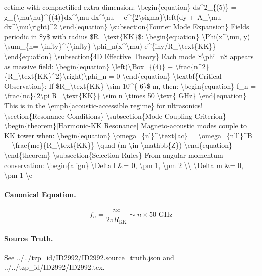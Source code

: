 cetime with compactified extra dimension: \textbackslash{}begin\{equation\} ds\textasciicircum{}2\_\{(5)\} = g\_\{\textbackslash{}mu\textbackslash{}nu\}\textasciicircum{}\{(4)\}dx\textasciicircum{}\textbackslash{}mu dx\textasciicircum{}\textbackslash{}nu + e\textasciicircum{}\{2\textbackslash{}sigma\}\textbackslash{}left(dy + A\_\textbackslash{}mu dx\textasciicircum{}\textbackslash{}mu\textbackslash{}right)\textasciicircum{}2 \textbackslash{}end\{equation\} \textbackslash{}subsection\{Fourier Mode Expansion\} Fields periodic in \$y\$ with radius \$R\_\textbackslash{}text\{KK\}\$: \textbackslash{}begin\{equation\} \textbackslash{}Phi(x\textasciicircum{}\textbackslash{}mu, y) = \textbackslash{}sum\_\{n=-\textbackslash{}infty\}\textasciicircum{}\{\textbackslash{}infty\} \textbackslash{}phi\_n(x\textasciicircum{}\textbackslash{}mu) e\textasciicircum{}\{iny/R\_\textbackslash{}text\{KK\}\} \textbackslash{}end\{equation\} \textbackslash{}subsection\{4D Effective Theory\} Each mode \$\textbackslash{}phi\_n\$ appears as massive field: \textbackslash{}begin\{equation\} \textbackslash{}left(\textbackslash{}Box\_\{(4)\} + \textbackslash{}frac\{n\textasciicircum{}2\}\{R\_\textbackslash{}text\{KK\}\textasciicircum{}2\}\textbackslash{}right)\textbackslash{}phi\_n = 0 \textbackslash{}end\{equation\} \textbackslash{}textbf\{Critical Observation\}: If \$R\_\textbackslash{}text\{KK\} \textbackslash{}sim 10\textasciicircum{}\{-6\}\$ m, then: \textbackslash{}begin\{equation\} f\_n = \textbackslash{}frac\{nc\}\{2\textbackslash{}pi R\_\textbackslash{}text\{KK\}\} \textbackslash{}sim n \textbackslash{}times 50 \textbackslash{}text\{ GHz\} \textbackslash{}end\{equation\} This is in the \textbackslash{}emph\{acoustic-accessible regime\} for ultrasonics! \textbackslash{}section\{Resonance Conditions\} \textbackslash{}subsection\{Mode Coupling Criterion\} \textbackslash{}begin\{theorem\}[Harmonic-KK Resonance] Magneto-acoustic modes couple to KK tower when: \textbackslash{}begin\{equation\} \textbackslash{}omega\_\{nl\}\textasciicircum{}\textbackslash{}text\{ac\} = \textbackslash{}omega\_\{n'l'\}\textasciicircum{}B + \textbackslash{}frac\{mc\}\{R\_\textbackslash{}text\{KK\}\} \textbackslash{}quad (m \textbackslash{}in \textbackslash{}mathbb\{Z\}) \textbackslash{}end\{equation\} \textbackslash{}end\{theorem\} \textbackslash{}subsection\{Selection Rules\} From angular momentum conservation: \textbackslash{}begin\{align\} \textbackslash{}Delta l \&= 0, \textbackslash{}pm 1, \textbackslash{}pm 2 \textbackslash{}\textbackslash{} \textbackslash{}Delta m \&= 0, \textbackslash{}pm 1 \textbackslash{}e

\paragraph{Canonical Equation.}
\[
\begin{equation} f_n = \frac{nc}{2\pi R_\text{KK}} \sim n \times 50 \text{ GHz} \end{equation}
\]

\paragraph{Source Truth.}
See ../../tzp\_id/ID2992/ID2992.source\_truth.json and ../../tzp\_id/ID2992/ID2992.tex.
